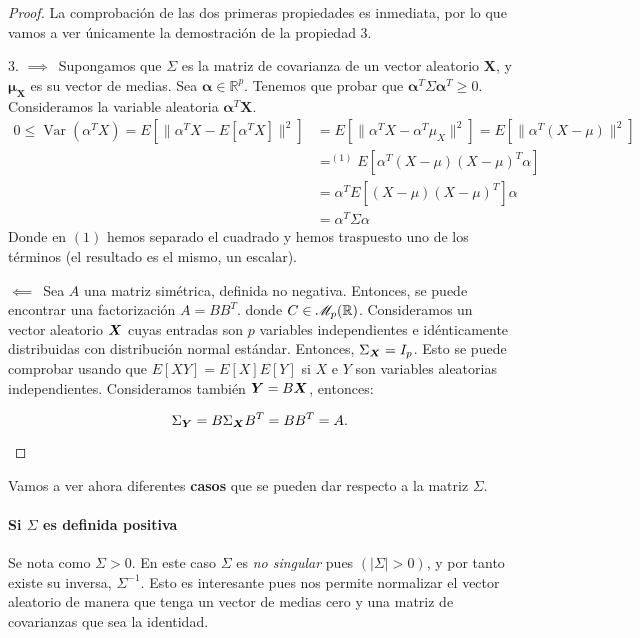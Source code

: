 \begin{proof}
  La comprobación de las dos primeras propiedades es inmediata, por lo que vamos a ver únicamente la demostración de la propiedad 3.
  \begin{nlist}
    \item[3.] $\boxed{\implies}\,$ Supongamos que $\Sigma$ es la matriz de covarianza de un vector aleatorio $\boldsymbol X$, y $\boldsymbol \mu_{\boldsymbol X}$ es su vector de medias. Sea $\boldsymbol \alpha \in \mathbb R^p$. Tenemos que probar que $\boldsymbol \alpha^T \Sigma \boldsymbol \alpha^T \geq 0$. Consideramos la variable aleatoria $\boldsymbol \alpha^T \boldsymbol X$. \begin{align*}
      0 \leq \operatorname{Var}(\alpha^T X) = E\left[\|\alpha^T X - E[\alpha^T X]\|^2\right] &= E\left[\|\alpha^T X - \alpha^T \mu_X\|^2\right] = E\left[\|\alpha^T(X-\mu)\|^2\right]\\ 
        &=^{(1)} E\left[\alpha^T(X-\mu)(X-\mu)^T \alpha\right] \\
        &= \alpha^T E\left[(X-\mu)(X-\mu)^T\right] \alpha \\
        &= \alpha^T \Sigma \alpha
    \end{align*} Donde en $(1)$ hemos separado el cuadrado y hemos traspuesto uno de los términos (el resultado es el mismo, un escalar).

    $\boxed{\impliedby}\,$ Sea $A$ una matriz simétrica, definida no negativa. Entonces, se puede encontrar una factorización $A = B B^T$. donde $C \in \mathscr{M}_{p}(\mathbb{R})$.
    Consideramos un vector aleatorio $\boldsymbol{X}$ cuyas entradas son $p$ variables independientes e idénticamente distribuidas con distribución normal estándar. Entonces, $\Sigma_{\boldsymbol{X}} = I_p$. Esto se puede comprobar usando que $E[XY] = E[X]E[Y]$ si $X$ e $Y$ son variables aleatorias independientes. Consideramos también $\boldsymbol{Y} = B\boldsymbol{X}$, entonces:

    \[
       \Sigma_{\boldsymbol{Y}} = B\Sigma_{\boldsymbol{X}} B^T = B B^T = A
    .\]

  \end{nlist}
\end{proof}

Vamos a ver ahora diferentes \textbf{casos} que se pueden dar respecto a la matriz $\Sigma$.

\paragraph{Si $\Sigma$ es definida positiva} Se nota como $\Sigma > 0$. En este caso $\Sigma$ es \emph{no singular} pues $(|\Sigma| > 0)$, y por tanto existe su inversa, $\Sigma^{-1}$. Esto es interesante pues nos permite normalizar el vector aleatorio de manera que tenga un vector de medias cero y una matriz de covarianzas que sea la identidad.

